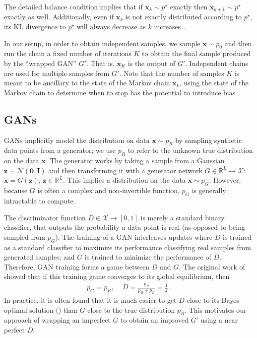 \documentclass{article}
\renewcommand{\vec}[1]{{\boldsymbol{\mathbf{#1}}}} %
\newcommand{\mat}[1]{{\ensuremath{\mathbf{#1}}}} %
\newcommand{\R}{\mathbb{R}}
\newcommand{\set}[1]{\mathcal{#1}}
\newcommand{\sample}{\sim}
\newcommand{\norm}{\mathcal{N}}
\newcommand{\target}{{p^\star}}
\newcommand{\pinit}{{p_0}}
\newcommand{\PG}{{p_G}}
\newcommand{\PR}{{p_R}}
\newcommand{\setx}{\set{X}}
\begin{document}
The detailed balance condition implies that if $\vec x_k \sample \target$ exactly then $\vec x_{k+1} \sample \target$ exactly as well.
Additionally, even if $\vec x_k$ is not exactly distributed according to $\target$, its KL divergence to $\target$ will always decrease as $k$ increases~\citep{Murray2008,Cover2012}.

In our setup, in order to obtain independent samples, we sample $\vec x \sample \pinit$ and then run the chain a fixed number of iterations $K$ to obtain the final sample produced by the ``wrapped GAN'' $G'$.
That is, $\vec x_K$ is the output of $G'$.
Independent chains are used for multiple samples from $G'$.
Note that the number of samples $K$ is meant to be ancillary to the state of the Markov chain $\vec x_k$, using the state of the Markov chain to determine when to stop has the potential to introduce bias~\citep{Cowles1999}.

\subsection{GANs}

GANs implicitly model the distribution on data $\vec x \sample \PR$ by sampling synthetic data points from a generator; we use $\PR$ to refer to the unknown true distribution on the data $\vec x$.
The generator works by taking a sample from a Gaussian $\vec z \sample \norm(\vec 0,\mat I)$ and then transforming it with a generator network $G \in \R^L \rightarrow \setx$: $\vec x = G(\vec z)$, $\vec z \in \R^L$.
This implies a distribution on the data $\vec x \sample \PG$.
However, because $G$ is often a complex and non-invertible function, $\PG$ is generally intractable to compute.

The discriminator function $D \in \setx \rightarrow [0,1]$ is merely a standard binary classifier, that outputs the probability a data point is real (as opposed to being sampled from $\PG$)\@.
The training of a GAN interleaves updates where $D$ is trained as a standard classifier to maximize its performance classifying real samples from generated samples; and $G$ is trained to minimize the performance of $D$.
Therefore, GAN training forms a game between $D$ and $G$.
The original work of~\citet{Goodfellow2014} showed that if this training game converges to its global equilibrium, then
\begin{align}
  \PG = \PR,\, \quad D = \frac{\PR}{\PR + \PG} = \frac{1}{2}\,.
\end{align}
In practice, it is often found that it is much easier to get $D$ close to its Bayes optimal solution (\smash{$\PR/(\PR + \PG)$}) than $G$ close to the true distribution $\PR$.
This motivates our approach of wrapping an imperfect $G$ to obtain an improved $G'$ using a near perfect $D$.
\end{document}
